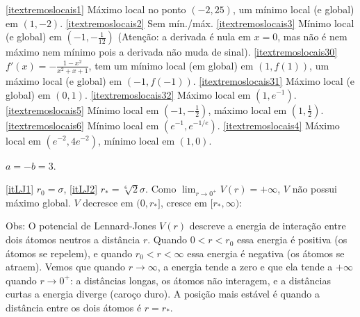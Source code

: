 \begin{Solution}{7.2}
\eqref{itextremoslocais1} Máximo local no ponto $(-2,25)$, um mínimo local (e
global) em $(1,-2)$.
\eqref{itextremoslocais2} Sem mín./máx.
\eqref{itextremoslocais3} Mínimo local (e global) em
$(-1,-\frac{1}{12})$ (Atenção: a derivada é nula em $x=0$, mas não é nem
máximo nem mínimo pois a derivada não muda de sinal).
\eqref{itextremoslocais30} $f'(x)=-\frac{1-x^2}{x^2+x+1}$, tem um mínimo local
(em global) em $(1,f(1))$, um máximo local (e global) em $(-1,f(-1))$.
\eqref{itextremoslocais31} Máximo local (e global) em $(0,1)$.
\eqref{itextremoslocais32} Máximo local em $(1,e^{-1})$.
\eqref{itextremoslocais5} Mínimo local em $(-1,-\frac12)$, máximo local em
$(1,\frac12)$.
\eqref{itextremoslocais6} Mínimo local em $(e^{-1},e^{-1/e})$.
\eqref{itextremoslocais4} Máximo local em $(e^{-2}, 4e^{-2})$, mínimo local em
$(1,0)$.
\end{Solution}
\begin{Solution}{7.3}
$a=-b=3$.
\end{Solution}
\begin{Solution}{7.4}
\eqref{itLJ1} $r_0=\sigma$, \eqref{itLJ2} $r_*=\sqrt[6]{2}\sigma$.
Como $\lim_{r\to 0^+}V(r)=+\infty$, $V$ não possui máximo global.
$V$ decresce em $(0,r_*]$, cresce em $[r_*,\infty)$:
\begin{center}
\begin{bmlimage}\end{bmlimage}
\end{center}
Obs: O potencial de Lennard-Jones $V(r)$ descreve a energia de interação entre
dois átomos neutros a distância $r$.
Quando $0<r<r_0$ essa energia é positiva (os átomos se repelem), e quando
$r_0<r<\infty$ essa energia é negativa (os átomos se atraem).
Vemos que quando $r\to \infty$, a energia tende a zero e que ela tende a
$+\infty$ quando $r\to 0^+$: a distâncias longas, os átomos não interagem, e a
distâncias curtas a energia diverge (caroço duro).
A posição mais estável é quando a distância entre os dois átomos é
$r=r_*$.
\end{Solution}
